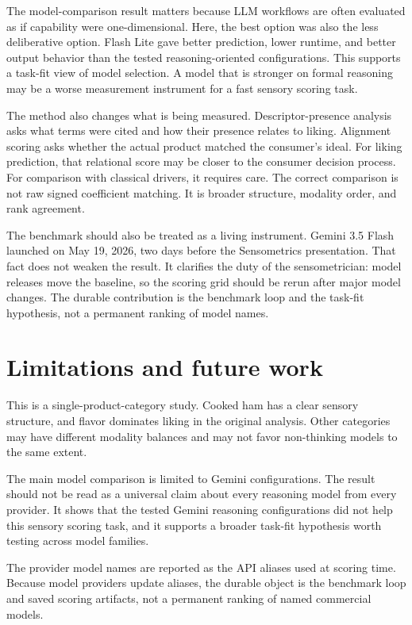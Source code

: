 \documentclass[12pt]{article}
\begin{document}
The model-comparison result matters because LLM workflows are often evaluated as if capability were one-dimensional. Here, the best option was also the less deliberative option. Flash Lite gave better prediction, lower runtime, and better output behavior than the tested reasoning-oriented configurations. This supports a task-fit view of model selection. A model that is stronger on formal reasoning may be a worse measurement instrument for a fast sensory scoring task.

The method also changes what is being measured. Descriptor-presence analysis asks what terms were cited and how their presence relates to liking. Alignment scoring asks whether the actual product matched the consumer's ideal. For liking prediction, that relational score may be closer to the consumer decision process. For comparison with classical drivers, it requires care. The correct comparison is not raw signed coefficient matching. It is broader structure, modality order, and rank agreement.

The benchmark should also be treated as a living instrument. Gemini 3.5 Flash launched on May 19, 2026, two days before the Sensometrics presentation. That fact does not weaken the result. It clarifies the duty of the sensometrician: model releases move the baseline, so the scoring grid should be rerun after major model changes. The durable contribution is the benchmark loop and the task-fit hypothesis, not a permanent ranking of model names.

\section{Limitations and future work}

This is a single-product-category study. Cooked ham has a clear sensory structure, and flavor dominates liking in the original analysis. Other categories may have different modality balances and may not favor non-thinking models to the same extent.

The main model comparison is limited to Gemini configurations. The result should not be read as a universal claim about every reasoning model from every provider. It shows that the tested Gemini reasoning configurations did not help this sensory scoring task, and it supports a broader task-fit hypothesis worth testing across model families.

The provider model names are reported as the API aliases used at scoring time. Because model providers update aliases, the durable object is the benchmark loop and saved scoring artifacts, not a permanent ranking of named commercial models.
\end{document}
